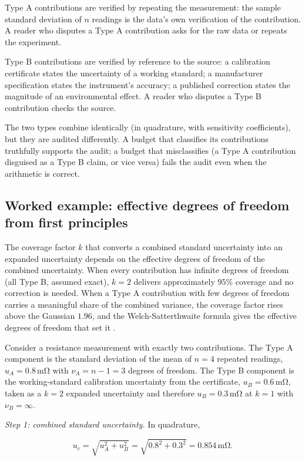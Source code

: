 Type A contributions are verified by repeating the measurement: the
sample standard deviation of $n$ readings is the data's own
verification of the contribution. A reader who disputes a Type A
contribution asks for the raw data or repeats the experiment.

Type B contributions are verified by reference to the source: a
calibration certificate states the uncertainty of a working
standard; a manufacturer specification states the instrument's
accuracy; a published correction states the magnitude of an
environmental effect. A reader who disputes a Type B contribution
checks the source.

The two types combine identically (in quadrature, with sensitivity
coefficients), but they are audited differently. A budget that
classifies its contributions truthfully supports the audit; a
budget that misclassifies (a Type A contribution disguised as a
Type B claim, or vice versa) fails the audit even when the
arithmetic is correct.

\subsection{Worked example: effective degrees of freedom from
first principles}

The coverage factor $k$ that converts a combined standard
uncertainty into an expanded uncertainty depends on the effective
degrees of freedom of the combined uncertainty. When every
contribution has infinite degrees of freedom (all Type B, assumed
exact), $k = 2$ delivers approximately $95\%$ coverage and no
correction is needed. When a Type A contribution with few degrees
of freedom carries a meaningful share of the combined variance, the
coverage factor rises above the Gaussian $1.96$, and the
Welch-Satterthwaite formula gives the effective degrees of freedom
that set it \cite{std:iso-iec-guide98}.

Consider a resistance measurement with exactly two contributions.
The Type A component is the standard deviation of the mean of
$n = 4$ repeated readings, $u_{A} = 0.8\,\si{\milli\ohm}$ with
$\nu_{A} = n - 1 = 3$ degrees of freedom. The Type B component is
the working-standard calibration uncertainty from the certificate,
$u_{B} = 0.6\,\si{\milli\ohm}$, taken as a $k = 2$ expanded
uncertainty and therefore $u_{B} = 0.3\,\si{\milli\ohm}$ at $k = 1$
with $\nu_{B} = \infty$.

\emph{Step 1: combined standard uncertainty.} In quadrature,

\[
u_{c} = \sqrt{u_{A}^{2} + u_{B}^{2}} =
\sqrt{0.8^{2} + 0.3^{2}} = 0.854\,\si{\milli\ohm}.
\]

